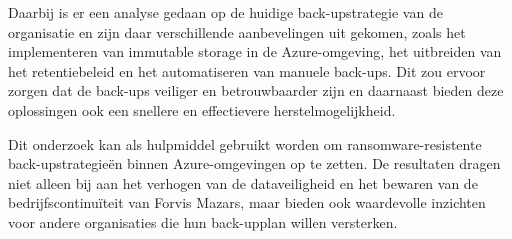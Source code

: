 Daarbij is er een analyse gedaan op de huidige back-upstrategie van de organisatie en zijn daar verschillende aanbevelingen uit gekomen, zoals het implementeren van immutable storage in de Azure-omgeving, het uitbreiden van het retentiebeleid en het automatiseren van manuele back-ups. Dit zou ervoor zorgen dat de back-ups veiliger en betrouwbaarder zijn en daarnaast bieden deze oplossingen ook een snellere en effectievere herstelmogelijkheid.

Dit onderzoek kan als hulpmiddel gebruikt worden om ransomware-resistente back-upstrategieën binnen Azure-omgevingen op te zetten. De resultaten dragen niet alleen bij aan het verhogen van de dataveiligheid en het bewaren van de bedrijfscontinuïteit van Forvis Mazars, maar bieden ook waardevolle inzichten voor andere organisaties die hun back-upplan willen versterken.















